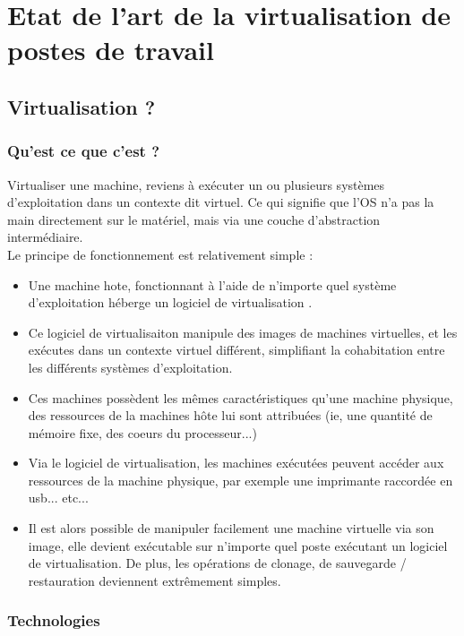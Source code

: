 
\section{Etat de l'art de la virtualisation de postes de travail}

\subsection{Virtualisation ?}

\subsubsection{Qu'est ce que c'est ?}

Virtualiser une machine, reviens à exécuter un ou plusieurs systèmes d'exploitation dans un contexte dit virtuel. Ce qui signifie que l'OS n'a pas la main directement sur le matériel, mais via une couche d'abstraction intermédiaire.\\ 

Le principe de fonctionnement est relativement simple : \\
\begin{itemize}
\item  Une machine hote, fonctionnant à l'aide de n'importe quel système d'exploitation héberge un logiciel de virtualisation .
\item Ce logiciel de virtualisaiton manipule des images de machines virtuelles, et les exécutes dans un contexte virtuel différent, simplifiant la cohabitation entre les différents systèmes d'exploitation.
\item Ces machines possèdent les mêmes caractéristiques qu'une machine physique, des ressources de la machines hôte lui sont attribuées (ie, une quantité de mémoire fixe,  des coeurs du processeur...)
\item Via le logiciel de virtualisation, les machines exécutées peuvent accéder aux ressources de la machine physique, par exemple une imprimante raccordée en usb... etc...
\item Il est alors possible de manipuler facilement une machine virtuelle via son image, elle devient exécutable sur n'importe quel poste exécutant un logiciel de virtualisation. De plus, les opérations de clonage, de sauvegarde / restauration deviennent extrêmement simples.
\end{itemize}

\subsubsection{Technologies}

